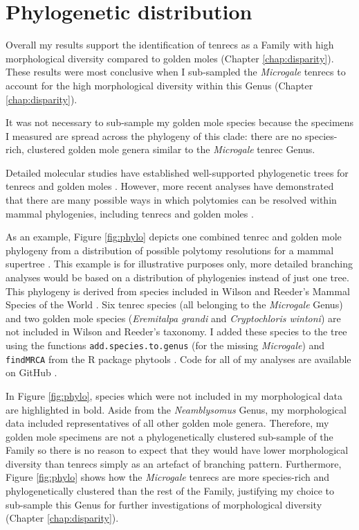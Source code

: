 
\chapter{Phylogenetic distribution}
\label{phylo}

Overall my results support the identification of tenrecs as a Family with high morphological diversity compared to golden moles (Chapter \ref{chap:disparity}). These results were most conclusive when I sub-sampled the \textit{Microgale} tenrecs to account for the high morphological diversity within this Genus (Chapter \ref{chap:disparity}).

It was not necessary to sub-sample my golden mole species because the specimens I measured are spread across the phylogeny of this clade: there are no species-rich, clustered golden mole genera similar to the \textit{Microgale} tenrec Genus.

Detailed molecular studies have established well-supported phylogenetic trees for tenrecs \citep{Poux2008, Asher2006} and golden moles \citep{Asher2010}. However, more recent analyses have demonstrated that there are many possible ways in which polytomies can be resolved within mammal phylogenies, including tenrecs and golden moles \citep{Kuhn2011}.

As an example, Figure \ref{fig:phylo} depicts one combined tenrec and golden mole phylogeny from a distribution of possible polytomy resolutions \citep{Kuhn2011} for a mammal supertree \citep{Fritz2009, Bininda2007}. This example is for illustrative purposes only, more detailed branching analyses would be based on a distribution of phylogenies instead of just one tree. This phylogeny is derived from species included in Wilson and Reeder's Mammal Species of the World \citeyearpar{Wilson2005}. Six tenrec species (all belonging to the \textit{Microgale} Genus) and two golden mole species (\textit{Eremitalpa grandi} and \textit{Cryptochloris wintoni}) are not included in Wilson and Reeder's taxonomy. I added these species to the tree using the functions \texttt{add.species.to.genus} (for the missing \textit{Microgale}) and \texttt{findMRCA} from the R package phytools \citep{Revell2012}. Code for all of my analyses are available on GitHub \citep{Finlay2015c}. 

In Figure \ref{fig:phylo}, species which were not included in my morphological data are highlighted in bold. Aside from the \textit{Neamblysomus} Genus, my morphological data included representatives of all other golden mole genera. Therefore, my golden mole specimens are not a phylogenetically clustered sub-sample of the Family so there is no reason to expect that they would have lower morphological diversity than tenrecs simply as an artefact of branching pattern. 
Furthermore, Figure \ref{fig:phylo} shows how the \textit{Microgale} tenrecs are more species-rich and phylogenetically clustered than the rest of the Family, justifying my choice to sub-sample this Genus for further investigations of morphological diversity (Chapter \ref{chap:disparity}).



